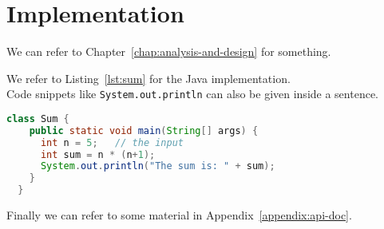 \chapter{Implementation}
\label{chap:implementation}




We can refer to Chapter~\ref{chap:analysis-and-design} for something.



We refer to Listing~\ref{lst:sum} for the Java implementation.\\ %
Code snippets like \lstinline{System.out.println} can also be given inside a sentence.

\begin{lstlisting}[language=java,caption={Our sum implementation},float=tb,label=lst:sum]
  class Sum {
    public static void main(String[] args) {
      int n = 5;   // the input
      int sum = n * (n+1);
      System.out.println("The sum is: " + sum);
    }
  }
\end{lstlisting}

Finally we can refer to some material in Appendix~\ref{appendix:api-doc}. 

